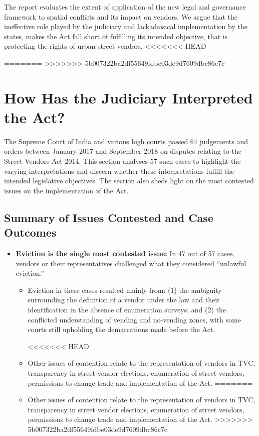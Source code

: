 \documentclass[a4paper, 12pt, twoside]{article}
\begin{document}
{The report evaluates the extent of application of the new legal and governance framework to spatial conflicts and its impact on vendors. We argue that the ineffective role played by the judiciary and lackadaisical implementation by the states, makes the Act fall short of fulfilling its intended objective, that is protecting the rights of urban street vendors.
<<<<<<< HEAD

=======
>>>>>>> 5b007322ba2df55649fdbe03de9d7609dbc86c7c
\section*{How Has the Judiciary Interpreted the Act?}

The Supreme Court of India and various high courts passed 64 judgements and orders between January 2017 and September 2018 on disputes relating to the Street Vendors Act 2014. This section analyses 57 such cases  to highlight the varying interpretations and discern whether these interpretations fulfill the intended legislative objectives. The section also sheds light on the most contested issues on the implementation of the Act.

\subsection*{Summary of Issues Contested and Case Outcomes}

\begin{itemize}[nosep]
\item \textbf{Eviction is the single most contested issue:} In 47 out of 57 cases, vendors or their representatives challenged what they considered “unlawful eviction.”

\begin{itemize}
\item Eviction in these cases resulted mainly from: (1) the ambiguity surrounding the definition of a vendor under the law and their identification in the absence of enumeration surveys; and (2) the conflicted understanding of vending and no-vending zones, with some courts still upholding the demarcations made before the Act.

<<<<<<< HEAD
\item 	Other issues of contention relate to the representation of vendors in TVC, transparency in street vendor elections, enumeration of street vendors, permissions to change trade and implementation of the Act.
=======
\item Other issues of contention relate to the representation of vendors in TVC, transparency in street vendor elections, enumeration of street vendors, permissions to change trade and implementation of the Act.
>>>>>>> 5b007322ba2df55649fdbe03de9d7609dbc86c7c


\end{itemize}
\end{itemize}}
\end{document}
